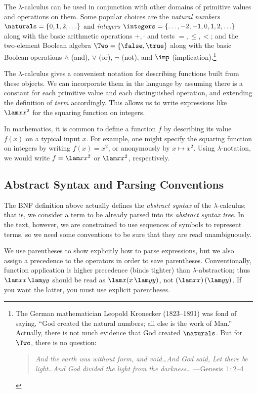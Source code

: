 The $\lambda$-calculus can be used in conjunction with other domains of primitive values and operations on them. Some popular choices are the \emph{natural numbers} $\naturals = \{0,1,2,\ldots\}$ and \emph{integers} $\integers = \{\ldots,-2,-1,0,1,2,\ldots\}$ along with the basic arithmetic operations $+,\cdot$ and tests $=,\leq,\lt$; and the two-element Boolean algebra $\Two = \{\false,\true\}$ along with the basic Boolean operations $\wedge$ (and), $\vee$ (or), $\neg$ (not), and $\imp$ (implication).\footnote{The German mathematician Leopold Kronecker (1823--1891) was fond of saying, ``God created the natural numbers; all else is the work of Man.'' Actually, there is not much evidence that God created $\naturals$. But for $\Two$, there is no question:
\begin{quote}
\emph{And the earth was without form, and void\ldots And God said, Let there be light\ldots And God divided the light from the darkness\ldots} \quad ---Genesis 1\,:\,2--4
\end{quote}}

The $\lambda$-calculus gives a convenient notation for describing functions built from these objects.
We can incorporate them in the language by assuming there is a constant for each primitive value and each distinguished operation, and extending the definition of \emph{term} accordingly. This allows us to write expressions like
$\lam x{x^2}$ for the squaring function on integers.

In mathematics, it is common to define a function $f$ by describing its value $f(x)$ on a typical input $x$. For example, one might specify the squaring function on integers by writing $f(x)=x^2$, or anonymously by $x\mapsto x^2$. Using $\lambda$-notation, we would write $f=\lam x{x^2}$ or $\lam x{x^2}$, respectively.

\subsection{Abstract Syntax and Parsing Conventions}

The BNF definition above actually defines the \emph{abstract syntax} of the
$\lambda$-calculus; that is, we consider a term to be already parsed into
its \emph{abstract syntax tree}.
In the text, however, we are constrained to use sequences of symbols to represent
terms, so we need some conventions to be sure that they are read unambiguously.

We use parentheses to show explicitly how to parse expressions, but we
also assign a precedence to the operators in order to save parentheses.
Conventionally, function application is higher precedence (binds tighter) than $\lambda$-abstraction;
thus $\lam xx\,\lam yy$ should be read as $\lam x{(x\,\lam yy)}$, not
$(\lam xx)\,(\lam yy)$. If you want the latter, you must use explicit parentheses.

